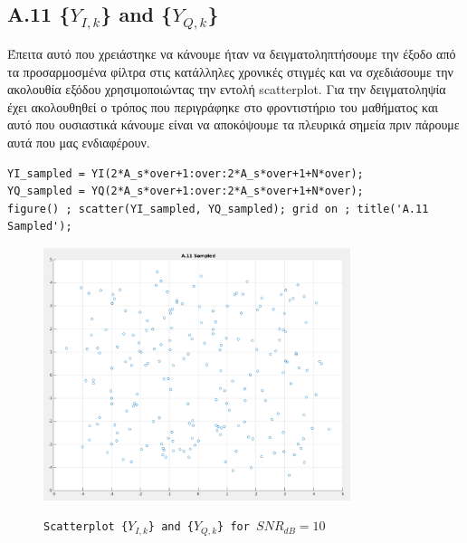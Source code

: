 \documentclass[11pt]{article}
\begin{document}
    \subsection*{A.11 \{$Y_{I,k}$\} and \{$Y_{Q,k}$\}}
    Έπειτα αυτό που χρειάστηκε να κάνουμε ήταν να δειγματοληπτήσουμε την έξοδο από τα προσαρμοσμένα φίλτρα στις κατάλληλες χρονικές στιγμές και να σχεδιάσουμε την ακολουθία εξόδου χρησιμοποιώντας την εντολή scatterplot. 
    Για την δειγματοληψία έχει ακολουθηθεί ο τρόπος που περιγράφηκε στο φροντιστήριο του μαθήματος και αυτό που ουσιαστικά κάνουμε είναι να αποκόψουμε τα πλευρικά σημεία πριν πάρουμε αυτά που μας ενδιαφέρουν.
    
    \begin{lstlisting}[caption = {A.11 \texttt{Calculate \{$Y_{I,k}$\} and \{$Y_{Q,k}$\}}}]
% A.11
YI_sampled = YI(2*A_s*over+1:over:2*A_s*over+1+N*over); 
YQ_sampled = YQ(2*A_s*over+1:over:2*A_s*over+1+N*over); 
figure() ; scatter(YI_sampled, YQ_sampled); grid on ; title('A.11 Sampled');
    \end{lstlisting}
    
    \begin{figure}[H]
        \centering
        \includegraphics[scale=0.5, width=0.8\textwidth]{img/A11_sampled.png} \\
        \caption{\texttt{Scatterplot \{$Y_{I,k}$\} and \{$Y_{Q,k}$\} for $SNR_{dB}=10$}}
    \end{figure}
    
\end{document}
